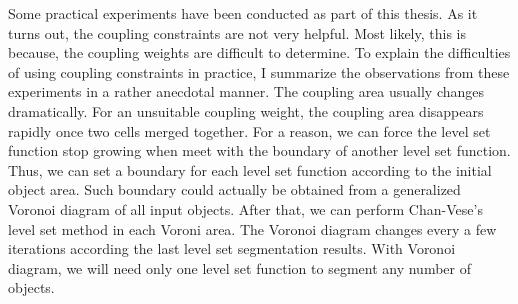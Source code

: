 Some practical experiments have been conducted as part of this thesis. As it turns out, the coupling constraints are not very helpful. Most likely, this is because, the coupling weights are difficult to determine. To explain the difficulties of using coupling constraints in practice, I summarize the observations from these experiments in a rather anecdotal manner. The coupling area usually changes dramatically. For an unsuitable coupling weight, the coupling area disappears rapidly once two cells merged together. For a reason, we can force the level set function stop growing when meet with the boundary of another level set function. Thus, we can set a boundary for each level set function according to the initial object area. Such boundary could actually be obtained from a generalized Voronoi diagram of all input objects. After that, we can perform Chan-Vese's level set method in each Voroni area. The Voronoi diagram changes every a few iterations according the last level set segmentation results. With Voronoi diagram, we will need only one level set function to segment any number of objects. 

